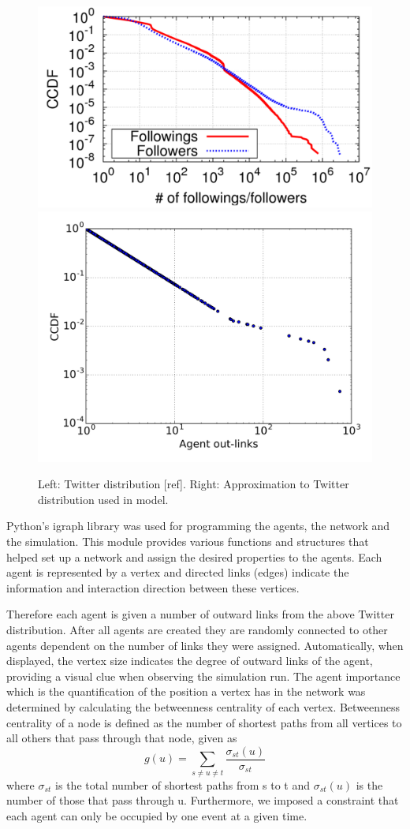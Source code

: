 \documentclass [12pt,a4paper,twoside]{article}
\begin{document}
\begin{figure}[h!]
  \centering
  \includegraphics[width=0.45\linewidth]{report/Twitter_real_distr}
  \includegraphics[width=0.54\linewidth]{report/Out-link_Distribution2}
  \caption{Left: Twitter distribution [ref]. Right: Approximation to Twitter distribution used in model.}
  \label{twitter_distr}
\end{figure}

Python's igraph library was used for programming the agents, the network and the simulation. This module provides various functions and structures that helped set up a network and assign the desired properties to the agents. Each agent is represented by a vertex and directed links (edges) indicate the information and interaction direction between these vertices.

Therefore each agent is given a number of outward links from the above Twitter distribution. After all agents are created they are randomly connected to other agents dependent on the number of links they were assigned. Automatically, when displayed, the vertex size indicates the degree of outward links of the agent, providing a visual clue when observing the simulation run. The agent importance which is the quantification of the position a vertex has in the network was determined by calculating the betweenness centrality of each vertex. Betweenness centrality of a node is defined as the number of shortest paths 	from all vertices to all others that pass through that node, given as
\begin{equation}
g(u) = \sum_{s\neq u\neq t} \frac{\sigma_{st}(u)}{\sigma_{st}}
\end{equation}
where $\sigma_{st}$ is the total number of shortest paths from s to t and $\sigma_{st}(u)$ is the number of those that pass through u. Furthermore, we imposed a constraint that each agent can only be occupied by one event at a given time.
\end{document}
